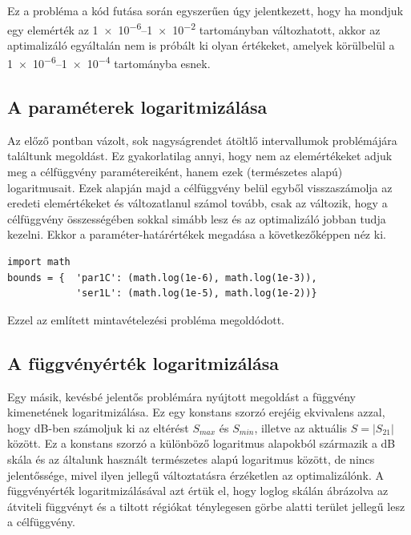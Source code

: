         Ez a probléma a kód futása során egyszerűen úgy jelentkezett, hogy ha mondjuk egy elemérték az \numrange{1e-6}{1e-2} tartományban változhatott, akkor az aptimalizáló egyáltalán nem is próbált ki olyan értékeket, amelyek körülbelül a \numrange{1e-6}{1e-4} tartományba esnek.
	\subsection{A paraméterek logaritmizálása}
        Az előző pontban vázolt, sok nagyságrendet átöltlő intervallumok problémájára találtunk megoldást. Ez gyakorlatilag annyi, hogy nem az elemértékeket adjuk meg a célfüggvény paramétereiként, hanem ezek (természetes alapú) logaritmusait. Ezek alapján majd a célfüggvény belül egyből visszaszámolja az eredeti elemértékeket és változatlanul számol tovább, csak az változik, hogy a célfüggvény összességében sokkal simább lesz és az optimalizáló jobban tudja kezelni. Ekkor a paraméter-határértékek megadása a következőképpen néz ki.
        \begin{lstlisting}
import math
bounds = {  'par1C': (math.log(1e-6), math.log(1e-3)),
            'ser1L': (math.log(1e-5), math.log(1e-2))}
\end{lstlisting}
        Ezzel az említett mintavételezési probléma megoldódott.
	\subsection{A függvényérték logaritmizálása}
        Egy másik, kevésbé jelentős problémára nyújtott megoldást a függvény kimenetének logaritmizálása. Ez egy konstans szorzó erejéig ekvivalens azzal, hogy dB-ben számoljuk ki az eltérést $S_{max}$ és $S_{min}$, illetve az aktuális $S=|S_{21}|$ között. Ez a konstans szorzó a különböző logaritmus alapokból származik a dB skála és az általunk használt természetes alapú logaritmus között, de nincs jelentőssége, mivel ilyen jellegű változtatásra érzéketlen az optimalizálónk. A függvényérték logaritmizálásával azt értük el, hogy loglog skálán ábrázolva az átviteli függvényt és a tiltott régiókat ténylegesen görbe alatti terület jellegű lesz a célfüggvény.
